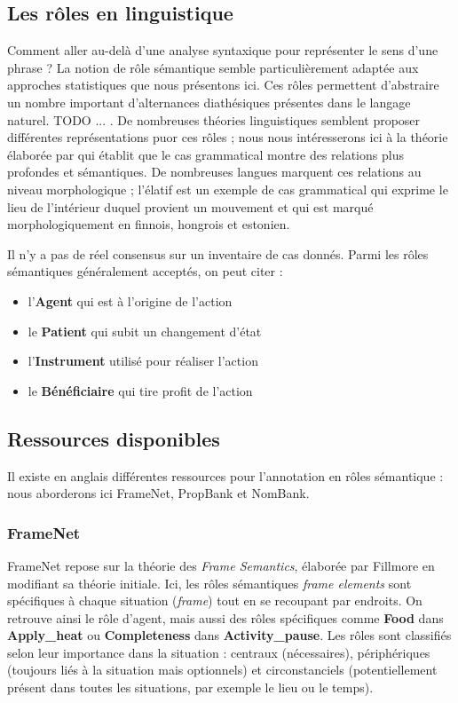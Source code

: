 \subsection{Les rôles en linguistique}

Comment aller au-delà d'une analyse syntaxique pour représenter le sens d'une
phrase ? La notion de rôle sémantique semble particulièrement adaptée aux
approches statistiques que nous présentons ici. Ces rôles permettent
d'abstraire un nombre important d'alternances diathésiques présentes dans le
langage naturel. TODO ... . De nombreuses théories linguistiques semblent
proposer différentes représentations puor ces rôles ; nous nous intéresserons
ici à la théorie élaborée par \cite{fillmore1968case} qui établit que le cas
grammatical montre des relations plus profondes et sémantiques. De nombreuses
langues marquent ces relations au niveau morphologique ; l'élatif est un
exemple de cas grammatical qui exprime le lieu de l'intérieur duquel provient
un mouvement et qui est marqué morphologiquement en finnois, hongrois et
estonien.

Il n'y a pas de réel consensus sur un inventaire de cas donnés. Parmi les rôles
sémantiques généralement acceptés, on peut citer :

\begin{itemize}
    \item l'\textbf{Agent} qui est à l'origine de l'action
    \item le \textbf{Patient} qui subit un changement d'état
    \item l'\textbf{Instrument} utilisé pour réaliser l'action
    \item le \textbf{Bénéficiaire} qui tire profit de l'action
\end{itemize}

\subsection{Ressources disponibles}

Il existe en anglais différentes ressources pour l'annotation en rôles
sémantique : nous aborderons ici FrameNet, PropBank et NomBank.

\subsubsection{FrameNet}

FrameNet repose sur la théorie des \textit{Frame Semantics}, élaborée par
Fillmore en modifiant sa théorie initiale. Ici, les rôles sémantiques
\textit{frame elements} sont spécifiques à chaque situation (\textit{frame})
tout en se recoupant par endroits. On retrouve ainsi le rôle d'agent, mais
aussi des rôles spécifiques comme \textbf{Food} dans \textbf{Apply\_heat} ou
\textbf{Completeness} dans \textbf{Activity\_pause}. Les rôles sont classifiés
selon leur importance dans la situation : centraux (nécessaires), périphériques
(toujours liés à la situation mais optionnels) et circonstanciels
(potentiellement présent dans toutes les situations, par exemple le lieu ou le
temps).

